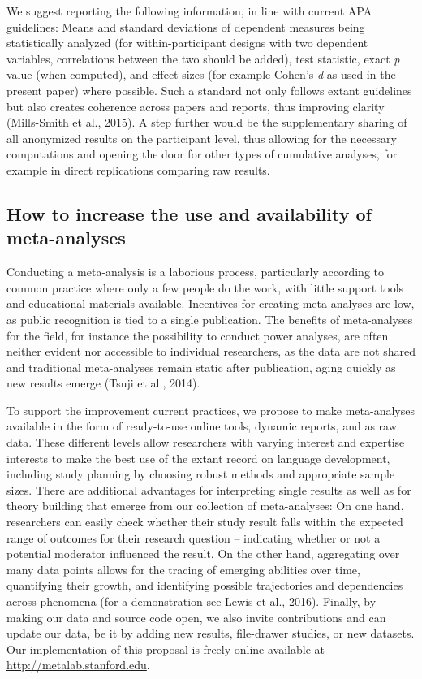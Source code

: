 \documentclass[english,floatsintext,man]{apa6}
\begin{document}
We suggest reporting the following information, in line with current APA
guidelines: Means and standard deviations of dependent measures being
statistically analyzed (for within-participant designs with two
dependent variables, correlations between the two should be added), test
statistic, exact \emph{p} value (when computed), and effect sizes (for
example Cohen's \emph{d} as used in the present paper) where possible.
Such a standard not only follows extant guidelines but also creates
coherence across papers and reports, thus improving clarity (Mills-Smith
et al., 2015). A step further would be the supplementary sharing of all
anonymized results on the participant level, thus allowing for the
necessary computations and opening the door for other types of
cumulative analyses, for example in direct replications comparing raw
results.

\subsection{How to increase the use and availability of
meta-analyses}\label{how-to-increase-the-use-and-availability-of-meta-analyses}

Conducting a meta-analysis is a laborious process, particularly
according to common practice where only a few people do the work, with
little support tools and educational materials available. Incentives for
creating meta-analyses are low, as public recognition is tied to a
single publication. The benefits of meta-analyses for the field, for
instance the possibility to conduct power analyses, are often neither
evident nor accessible to individual researchers, as the data are not
shared and traditional meta-analyses remain static after publication,
aging quickly as new results emerge (Tsuji et al., 2014).

To support the improvement current practices, we propose to make
meta-analyses available in the form of ready-to-use online tools,
dynamic reports, and as raw data. These different levels allow
researchers with varying interest and expertise interests to make the
best use of the extant record on language development, including study
planning by choosing robust methods and appropriate sample sizes. There
are additional advantages for interpreting single results as well as for
theory building that emerge from our collection of meta-analyses: On one
hand, researchers can easily check whether their study result falls
within the expected range of outcomes for their research question --
indicating whether or not a potential moderator influenced the result.
On the other hand, aggregating over many data points allows for the
tracing of emerging abilities over time, quantifying their growth, and
identifying possible trajectories and dependencies across phenomena (for
a demonstration see Lewis et al., 2016). Finally, by making our data and
source code open, we also invite contributions and can update our data,
be it by adding new results, file-drawer studies, or new datasets. Our
implementation of this proposal is freely online available at
\url{http://metalab.stanford.edu}.
\end{document}
